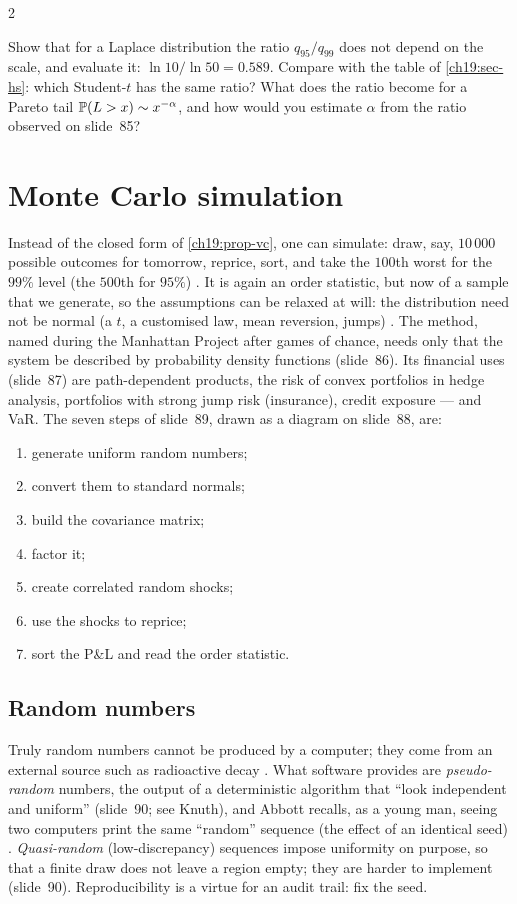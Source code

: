\begin{paracol}{2}
\begin{exercise}
Show that for a Laplace distribution the ratio $q_{95}/q_{99}$ does not depend on the scale, and evaluate it: $\ln10/\ln50=0.589$. Compare with the table of \cref{ch19:sec-hs}: which Student-$t$ has the same ratio? What does the ratio become for a Pareto tail $\mathbb{P}(L>x)\sim x^{-\alpha}$, and how would you estimate $\alpha$ from the ratio observed on slide~85?
\end{exercise}

\section{Monte Carlo simulation}\label{ch19:sec-mc}
Instead of the closed form of \cref{ch19:prop-vc}, one can simulate: draw, say, $10\,000$ possible outcomes for tomorrow, reprice, sort, and take the $100$th worst for the $99\%$ level (the $500$th for $95\%$) . It is again an order statistic, but now of a sample that we generate, so the assumptions can be relaxed at will: the distribution need not be normal (a $t$, a customised law, mean reversion, jumps) . The method, named during the Manhattan Project after games of chance, needs only that the system be described by probability density functions (slide~86). Its financial uses (slide~87) are path-dependent products, the risk of convex portfolios in hedge analysis, portfolios with strong jump risk (insurance), credit exposure --- and VaR. The seven steps of slide~89, drawn as a diagram on slide~88, are:
\begin{enumerate}[1.]
  \item generate uniform random numbers;
  \item convert them to standard normals;
  \item build the covariance matrix;
  \item factor it;
  \item create correlated random shocks;
  \item use the shocks to reprice;
  \item sort the P\&L and read the order statistic.
\end{enumerate}

\subsection{Random numbers}
Truly random numbers cannot be produced by a computer; they come from an external source such as radioactive decay . What software provides are \emph{pseudo-random} numbers, the output of a deterministic algorithm that ``look independent and uniform'' (slide~90; see Knuth), and Abbott recalls, as a young man, seeing two computers print the same ``random'' sequence (the effect of an identical seed) . \emph{Quasi-random} (low-discrepancy) sequences impose uniformity on purpose, so that a finite draw does not leave a region empty; they are harder to implement (slide~90). Reproducibility is a virtue for an audit trail: fix the seed.


\end{paracol}
